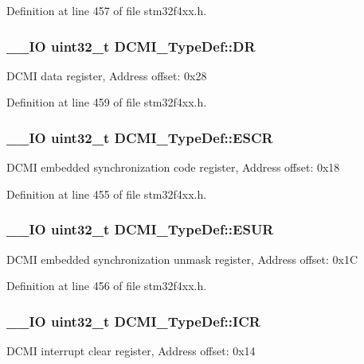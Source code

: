 Definition at line 457 of file stm32f4xx.\-h.

\hypertarget{struct_d_c_m_i___type_def_a266cec1031b0be730b0e35523f5e2934}{
\subsubsection[{D\-R}]{\setlength{\rightskip}{0pt plus 5cm}\-\_\-\-\_\-\-I\-O {\bf uint32\-\_\-t} D\-C\-M\-I\-\_\-\-Type\-Def\-::\-D\-R}}\label{struct_d_c_m_i___type_def_a266cec1031b0be730b0e35523f5e2934}
D\-C\-M\-I data register, Address offset\-: 0x28 

Definition at line 459 of file stm32f4xx.\-h.

\hypertarget{struct_d_c_m_i___type_def_a52c16b920a3f25fda961d0cd29749433}{
\subsubsection[{E\-S\-C\-R}]{\setlength{\rightskip}{0pt plus 5cm}\-\_\-\-\_\-\-I\-O {\bf uint32\-\_\-t} D\-C\-M\-I\-\_\-\-Type\-Def\-::\-E\-S\-C\-R}}\label{struct_d_c_m_i___type_def_a52c16b920a3f25fda961d0cd29749433}
D\-C\-M\-I embedded synchronization code register, Address offset\-: 0x18 

Definition at line 455 of file stm32f4xx.\-h.

\hypertarget{struct_d_c_m_i___type_def_af00a94620e33f4eff74430ff25c12b94}{
\subsubsection[{E\-S\-U\-R}]{\setlength{\rightskip}{0pt plus 5cm}\-\_\-\-\_\-\-I\-O {\bf uint32\-\_\-t} D\-C\-M\-I\-\_\-\-Type\-Def\-::\-E\-S\-U\-R}}\label{struct_d_c_m_i___type_def_af00a94620e33f4eff74430ff25c12b94}
D\-C\-M\-I embedded synchronization unmask register, Address offset\-: 0x1\-C 

Definition at line 456 of file stm32f4xx.\-h.

\hypertarget{struct_d_c_m_i___type_def_a0371fc07916e3043e1151eaa97e172c9}{
\subsubsection[{I\-C\-R}]{\setlength{\rightskip}{0pt plus 5cm}\-\_\-\-\_\-\-I\-O {\bf uint32\-\_\-t} D\-C\-M\-I\-\_\-\-Type\-Def\-::\-I\-C\-R}}\label{struct_d_c_m_i___type_def_a0371fc07916e3043e1151eaa97e172c9}
D\-C\-M\-I interrupt clear register, Address offset\-: 0x14 

